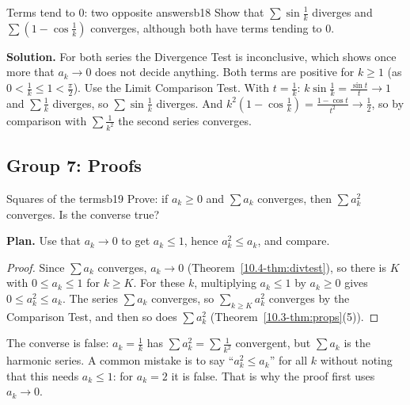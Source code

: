 \documentclass[11pt]{article}
\begin{document}
\begin{exmp}{Terms tend to $0$: two opposite answers}{b18}
Show that $\sum\sin\frac1k$ diverges and $\sum\left(1-\cos\frac1k\right)$ converges, although both have terms tending to $0$.

\textbf{Solution.} For both series the Divergence Test is inconclusive, which shows once more that $a_k\to0$ does not decide anything. Both terms are positive for $k\ge1$ (as $0<\frac1k\le1<\frac\pi2$). Use the Limit Comparison Test. With $t=\frac1k$: $k\sin\frac1k=\frac{\sin t}t\to1$ and $\sum\frac1k$ diverges, so $\sum\sin\frac1k$ diverges. And $k^2\left(1-\cos\frac1k\right)=\frac{1-\cos t}{t^2}\to\frac12$, so by comparison with $\sum\frac1{k^2}$ the second series converges.
\end{exmp}

\subsection*{Group 7: Proofs}

\begin{exmp}{Squares of the terms}{b19}
Prove: if $a_k\ge0$ and $\sum a_k$ converges, then $\sum a_k^2$ converges. Is the converse true?

\textbf{Plan.} Use that $a_k\to0$ to get $a_k\le1$, hence $a_k^2\le a_k$, and compare.

\begin{proof}
Since $\sum a_k$ converges, $a_k\to0$ (Theorem~\ref{10.4-thm:divtest}), so there is $K$ with $0\le a_k\le1$ for $k\ge K$. For these $k$, multiplying $a_k\le1$ by $a_k\ge0$ gives $0\le a_k^2\le a_k$. The series $\sum a_k$ converges, so $\sum_{k\ge K}a_k^2$ converges by the Comparison Test, and then so does $\sum a_k^2$ (Theorem~\ref{10.3-thm:props}(5)).
\end{proof}
The converse is false: $a_k=\frac1k$ has $\sum a_k^2=\sum\frac1{k^2}$ convergent, but $\sum a_k$ is the harmonic series. A common mistake is to say ``$a_k^2\le a_k$'' for all $k$ without noting that this needs $a_k\le1$: for $a_k=2$ it is false. That is why the proof first uses $a_k\to0$.
\end{exmp}
\end{document}
